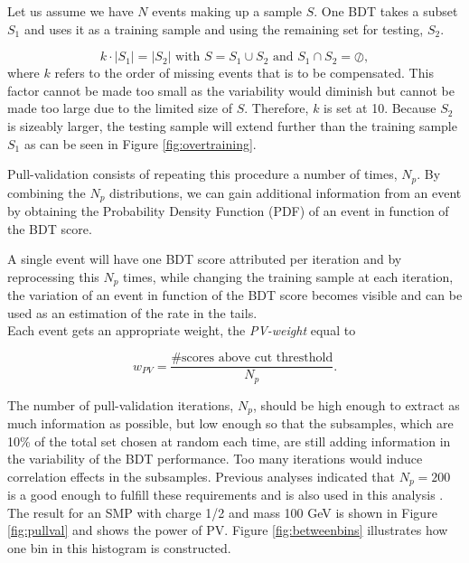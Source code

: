 \noindent Let us assume we have $N$ events making up a sample $S$. One BDT takes a subset $S_1$ and uses it as a training sample and using the remaining set for testing, $S_2$. 

\begin{equation}
k \cdot \left| S_1 \right| = \left| S_2 \right| \textrm{ with } S = S_1 \cup S_2 \textrm{ and } S_1 \cap S_2 = \oslash, 
\end{equation}
where $k$ refers to the order of missing events that is to be compensated. This factor cannot be made too small as the variability would diminish but cannot be made too large due to the limited size of $S$. Therefore, $k$ is set at 10. Because $S_2$ is sizeably larger, the testing sample will extend further than the training sample $S_1$ as can be seen in Figure \ref{fig:overtraining}. 

Pull-validation consists of repeating this procedure a number of times, $N_p$. By combining the $N_p$ distributions, we can gain additional information from an event by obtaining the Probability Density Function (PDF) of an event in function of the BDT score. 

A single event will have one BDT score attributed per iteration and by reprocessing this $N_p$ times, while changing the training sample at each iteration, the variation of an event in function of the BDT score becomes visible and can be used as an estimation of the rate in the tails.\\

\noindent Each event gets an appropriate weight, the \textit{PV-weight} equal to

\begin{equation}
\label{eq:pullweight}
w_{PV} = \frac{\# \textrm{scores above cut thresthold}}{N_p}.
\end{equation}

The number of pull-validation iterations, $N_p$, should be high enough to extract as much information as possible, but low enough so that the subsamples, which are 10\% of the total set chosen at random each time, are still adding information in the variability of the BDT performance. Too many iterations would induce correlation effects in the subsamples. Previous analyses indicated that $N_p = 200$ is a good enough to fulfill these requirements and is also used in this analysis \cite{Aartsen:2016fep,Aartsen:2015exf}. The result for an SMP with charge 1/2 and mass 100 GeV is shown in Figure \ref{fig:pullval} and shows the power of PV. Figure \ref{fig:betweenbins} illustrates how one bin in this histogram is constructed.\\
 
